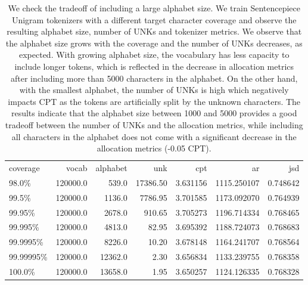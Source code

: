 \begin{table}
\centering
\caption{We check the tradeoff of including a large alphabet size. We train Sentencepiece Unigram tokenizers with a different target character coverage and observe the resulting alphabet size, number of UNKs and tokenizer metrics. We observe that the alphabet size grows with the coverage and the number of UNKs decreases, as expected. With growing alphabet size, the vocabulary has less capacity to include longer tokens, which is reflected in the decrease in allocation metrics after including more than 5000 characters in the alphabet. On the other hand, with the smallest alphabet, the number of UNKs is high which negatively impacts CPT as the tokens are artificially split by the unknown characters. The results indicate that the alphabet size between 1000 and 5000 provides a good tradeoff between the number of UNKs and the allocation metrics, while including all characters in the alphabet does not come with a significant decrease in the allocation metrics (-0.05 CPT).}
\label{tab:coverage_influence}
\begin{tabular}{lrrrrrr}
\toprule
 coverage &    vocab &  alphabet &      unk &      cpt &          ar &      jsd \\
    98.0\% & 120000.0 &     539.0 & 17386.50 & 3.631156 & 1115.250107 & 0.748642 \\
\midrule
    99.5\% & 120000.0 &    1136.0 &  7786.95 & 3.701585 & 1173.092070 & 0.764939 \\
   99.95\% & 120000.0 &    2678.0 &   910.65 & 3.705273 & 1196.714334 & 0.768465 \\
  99.995\% & 120000.0 &    4813.0 &    82.95 & 3.695392 & 1188.724073 & 0.768683 \\
 99.9995\% & 120000.0 &    8226.0 &    10.20 & 3.678148 & 1164.241707 & 0.768564 \\
99.99995\% & 120000.0 &   12362.0 &     2.30 & 3.656834 & 1133.239755 & 0.768358 \\
   100.0\% & 120000.0 &   13658.0 &     1.95 & 3.650257 & 1124.126335 & 0.768328 \\
\bottomrule
\end{tabular}
\end{table}
